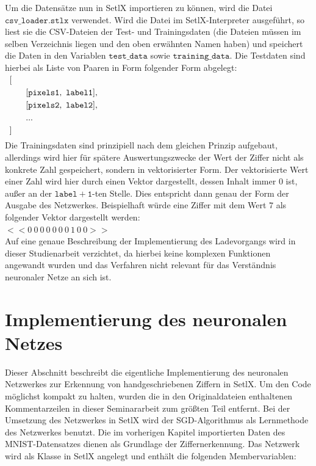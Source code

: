 Um die Datensätze nun in SetlX importieren zu können, wird die Datei $\mathtt{csv\_loader.stlx}$ verwendet. Wird die Datei im SetlX-Interpreter ausgeführt, so liest sie die CSV-Dateien der Test- und Trainingsdaten (die Dateien müssen im selben Verzeichnis liegen und den oben erwähnten Namen haben) und speichert die Daten in den Variablen $\mathtt{test\_data}$ sowie $\mathtt{training\_data}$. Die Testdaten sind hierbei als Liste von Paaren in Form folgender Form abgelegt: \\
\hspace*{0.3cm}
$
\begin{array}[t]{lcll}
	[ \\[0.1cm]
	
	\hspace*{0.5cm}
	\begin{array}[t]{lcll}
    	[\mathtt{pixels1},\ \mathtt{label1}], \\[0.1cm]
    	[\mathtt{pixels2},\ \mathtt{label2}], \\[0.1cm]
    	... \\[0.1cm]
    \end{array}
    \\[0.1cm]
    
    ] \\[0.1cm]
\end{array}
$
\\[0.0cm]

\noindent
Die Trainingsdaten sind prinzipiell nach dem gleichen Prinzip aufgebaut, allerdings wird hier für spätere Auswertungszwecke der Wert der Ziffer nicht als konkrete Zahl gespeichert, sondern in vektorisierter Form. Der vektorisierte Wert einer Zahl wird hier durch einen Vektor dargestellt, dessen Inhalt immer 0 ist, außer an der $\mathtt{label+1}$-ten Stelle. Dies entspricht dann genau der Form der Ausgabe des Netzwerkes. Beispielhaft würde eine Ziffer mit dem Wert $7$ als folgender Vektor dargestellt werden: \\
$<<0\ 0\ 0\ 0\ 0\ 0\ 0\ 1\ 0\ 0>>$ \\

\noindent
Auf eine genaue Beschreibung der Implementierung des Ladevorgangs wird in dieser Studienarbeit verzichtet, da hierbei keine komplexen Funktionen angewandt wurden und das Verfahren nicht relevant für das Verständnis neuronaler Netze an sich ist.

\section{Implementierung des neuronalen Netzes}
Dieser Abschnitt beschreibt die eigentliche Implementierung des neuronalen Netzwerkes zur Erkennung von handgeschriebenen Ziffern in SetlX. Um den Code möglichst kompakt zu halten, wurden die in den Originaldateien enthaltenen Kommentarzeilen in dieser Seminararbeit zum größten Teil entfernt.
Bei der Umsetzung des Netzwerkes in SetlX wird der SGD-Algorithmus als Lernmethode des Netzwerkes benutzt. Die im vorherigen Kapitel importierten Daten des MNIST-Datensatzes dienen als Grundlage der Ziffernerkennung. 
Das Netzwerk wird als Klasse in SetlX angelegt und enthält die folgenden Membervariablen:

